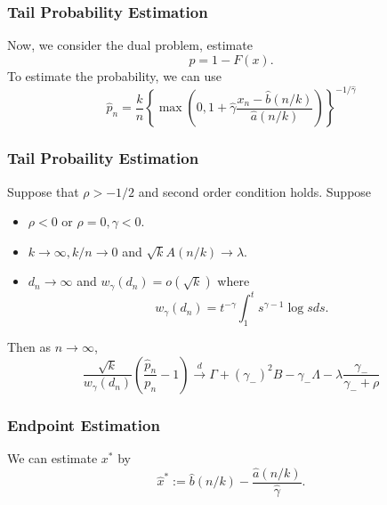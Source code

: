 \documentclass{beamer}
\begin{document}
\begin{frame}
    \frametitle{Tail Probability Estimation}

    Now, we consider the dual problem, estimate 
    $$
    p = 1-F(x).
    $$
    To estimate the probability, we can use 
    $$
    \hat{p}_n = \dfrac{k}{n} \left\{\max\left(0, 1+\hat{\gamma} \dfrac{x_n-\hat{b}(n/k)}{\hat{a}(n/k)}    \right)\right\}^{-1/\hat{\gamma}}
    $$    

\end{frame}


\begin{frame}
    \frametitle{Tail Probaility Estimation}
Suppose that $\rho>-1/2$ and second order condition holds. Suppose
\begin{itemize}
    \item $\rho<0$ or $\rho=0,\gamma<0$.
    \item $k\to \infty, k/n \to 0$ and $\sqrt{k}A(n/k)\to \lambda$.
    \item $d_n\to \infty$ and $w_{\gamma}(d_n)=o(\sqrt{k})$ where
        $$
        w_{\gamma}(d_n)=t^{-\gamma}\int_{1}^{t} s^{\gamma-1}\log sds.
        $$
\end{itemize}
Then as $n \to \infty$,
$$
\dfrac{\sqrt{k}}{w_{\gamma}(d_n)}\left(\dfrac{\hat{p}_n}{p_n}-1\right)\stackrel{d}{\to} \Gamma + (\gamma_{-})^2B -{\gamma_{-}}\Lambda -\lambda \dfrac{\gamma_{-}}{\gamma_{-}+\rho}
$$
\end{frame}


\begin{frame}
    \frametitle{Endpoint Estimation}
We can estimate $x^*$ by 
$$
\hat{x}^*:=\hat{b}(n/k)-\dfrac{\hat{a}(n/k)}{\hat{\gamma}}.
$$
    

\end{frame}
\end{document}
